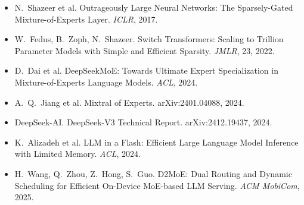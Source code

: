 \begin{frame}
\begin{itemize}
\item N.~Shazeer et al. Outrageously Large Neural Networks: The Sparsely-Gated Mixture-of-Experts Layer. \emph{ICLR}, 2017.
\item W.~Fedus, B.~Zoph, N.~Shazeer. Switch Transformers: Scaling to Trillion Parameter Models with Simple and Efficient Sparsity. \emph{JMLR}, 23, 2022.
\item D.~Dai et al. DeepSeekMoE: Towards Ultimate Expert Specialization in Mixture-of-Experts Language Models. \emph{ACL}, 2024.
\item A.~Q.~Jiang et al. Mixtral of Experts. arXiv:2401.04088, 2024.
\item DeepSeek-AI. DeepSeek-V3 Technical Report. arXiv:2412.19437, 2024.
\item K.~Alizadeh et al. LLM in a Flash: Efficient Large Language Model Inference with Limited Memory. \emph{ACL}, 2024.
\item H.~Wang, Q.~Zhou, Z.~Hong, S.~Guo. D2MoE: Dual Routing and Dynamic Scheduling for Efficient On-Device MoE-based LLM Serving. \emph{ACM MobiCom}, 2025.
\end{itemize}
\end{frame}


